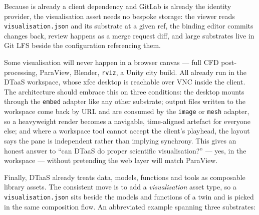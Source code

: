 Because  is already a client dependency and GitLab is already the
identity provider, the visualisation asset needs no bespoke storage: the viewer reads
\texttt{visualisation.json} and its substrate at a given ref, the binding editor commits
changes back, review happens as a merge request diff, and large substrates live in Git
LFS beside the configuration referencing them.

Some visualisation will never happen in a browser canvas --- full CFD post-processing,
ParaView, Blender, \texttt{rviz}, a Unity city build. All already run in the DTaaS
workspace, whose xfce desktop is reachable over VNC inside the client. The architecture
should embrace this on three conditions: the desktop mounts through the \texttt{embed}
adapter like any other substrate; output files written to the workspace come back by URL
and are consumed by the \texttt{image} or \texttt{mesh} adapter, so a heavyweight render
becomes a navigable, time-aligned artefact for everyone else; and where a workspace tool
cannot accept the client's playhead, the layout says the pane is independent rather than
implying synchrony. This gives an honest answer to ``can DTaaS do proper scientific
visualisation?'' --- yes, in the workspace --- without pretending the web layer will
match ParaView.

Finally, DTaaS already treats data, models, functions and tools as composable library
assets. The consistent move is to add a \emph{visualisation} asset type, so a
\texttt{visualisation.json} sits beside the models and functions of a twin and is picked
in the same composition flow. An abbreviated example spanning three substrates:

